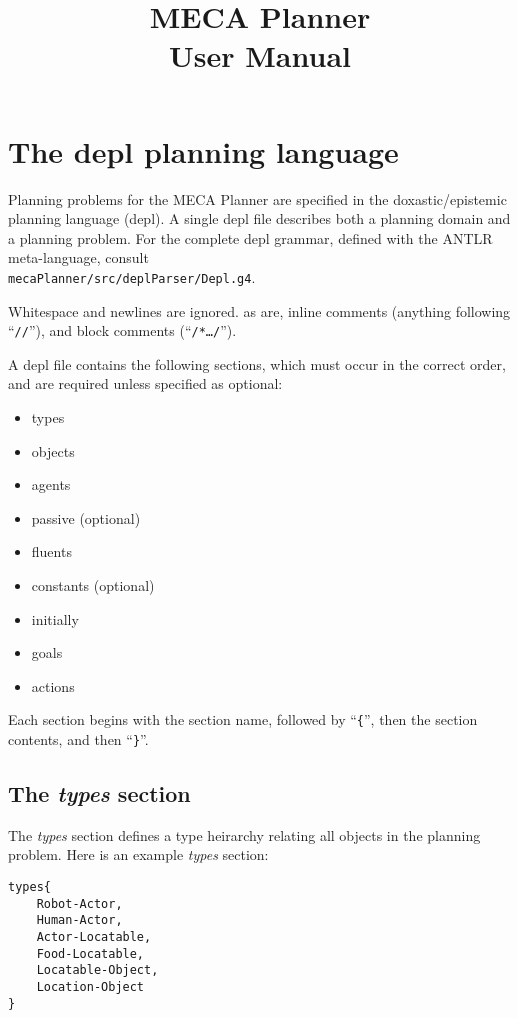 \documentclass{article}
\title{MECA Planner  \\
\large User Manual
}
\begin{document}
\maketitle

\section{The depl planning language}

Planning problems for the MECA Planner are specified in the doxastic/epistemic
planning language (depl). A single depl file describes both a planning domain
and a planning problem.
For the complete depl grammar, defined with the ANTLR meta-language, consult\\
\texttt{mecaPlanner/src/deplParser/Depl.g4}.

Whitespace and newlines are ignored.
as are, inline comments (anything
following ``\texttt{//}''), and block comments (``\texttt{/*\ldots*/}'').

A depl file contains the following sections, which must occur in the correct
order, and are required unless specified as optional:

\begin{itemize}
\item types
\item objects
\item agents
\item passive (optional)
\item fluents
\item constants (optional)
\item initially
\item goals
\item actions
\end{itemize}

\noindent
Each section begins with the section name, followed by
``\verb|{|'', 
then the section contents, and then
``\verb|}|''. 


\subsection{The \emph{types} section}

The \emph{types} section defines a type heirarchy relating all objects in the planning
problem.
Here is an example \emph{types} section:
\begin{verbatim}
types{
    Robot-Actor,
    Human-Actor,
    Actor-Locatable,
    Food-Locatable,
    Locatable-Object,
    Location-Object
}
\end{verbatim}
\end{document}
